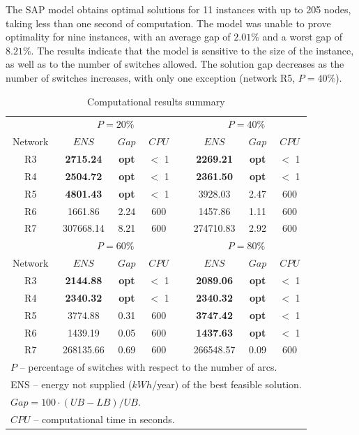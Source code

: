 The SAP model obtains optimal solutions for 11 instances with up to 205 nodes, taking less than one second of computation. The model was unable to prove optimality for nine instances, with an average gap of $2.01\%$ and a worst gap of $8.21\%$. 
The results indicate that the model is sensitive to the size of the instance, as well as to the number of switches allowed. The solution gap decreases as the number of switches increases, with only one exception (network R5, $P = 40\%$). 


\begin{table}[ht!]
\caption{Computational results summary}
\begin{center} {
\begin{tabular}{ c c c c p{0.1cm} c c c } \label{tbl:results}
\\ 
 \cline{1-8}
 & \multicolumn{3}{c}{$P = 20\%$} &  & \multicolumn{3}{c}{$P = 40\%$} \\ \cline{2-4} \cline{6-8} 
 Network &  $ENS$ & $Gap$ & $CPU$ & & $ENS$ & $Gap$ & $CPU$ \\ \hline
R3 &  \textbf{2715.24} & \textbf{opt} & $<$ 1 &  & \textbf{2269.21} & \textbf{opt} & $<$ 1  \\ 
R4 &  \textbf{2504.72} & \textbf{opt} & $<$ 1 &  & \textbf{2361.50} & \textbf{opt} & $<$ 1   \\ 
R5 &  \textbf{4801.43} & \textbf{opt} & $<$ 1 &  & 3928.03 & 2.47 & 600 \\ 
R6 & 1661.86 & 2.24 & 600 &  & 1457.86 & 1.11 & 600 \\ 
R7 &  307668.14 & 8.21 & 600 &  & 274710.83 & 2.92 & 600 \\ 
 
  & \multicolumn{3}{c}{$P = 60\%$} &  & \multicolumn{3}{c}{$P = 80\%$} \\ \cline{2-4} \cline{6-8} 
 Network  & $ENS$ & $Gap$ & $CPU$ & & $ENS$ & $Gap$ & $CPU$ \\ \hline
R3 &  \textbf{2144.88}  & \textbf{opt} & $<$ 1 &  & \textbf{2089.06} & \textbf{opt} & $<$ 1  \\ 
R4 &  \textbf{2340.32} & \textbf{opt} & $<$ 1 &  & \textbf{2340.32} & \textbf{opt} & $<$ 1 \\ 
R5 &   3774.88 & 0.31 & 600 &  & \textbf{3747.42} & \textbf{opt} & $<$ 1 \\ 
R6 &  1439.19 & 0.05 & 600 &  & \textbf{1437.63} & \textbf{opt} & $<$ 1 \\ 
R7 &  268135.66 & 0.69 & 600 &  & 266548.57 & 0.09 & 600 \\ \hline
\multicolumn{8}{l}{$P$ -- percentage of switches with respect to the number of arcs.} \\
\multicolumn{8}{l}{ENS -- energy not supplied ($kWh$/year) of the best feasible solution.} \\
\multicolumn{8}{l}{$Gap = 100\cdot(UB-LB)/UB$.} \\
\multicolumn{8}{l}{$CPU$ -- computational time in seconds.} \\
\end{tabular} } 
\end{center} \end{table}


